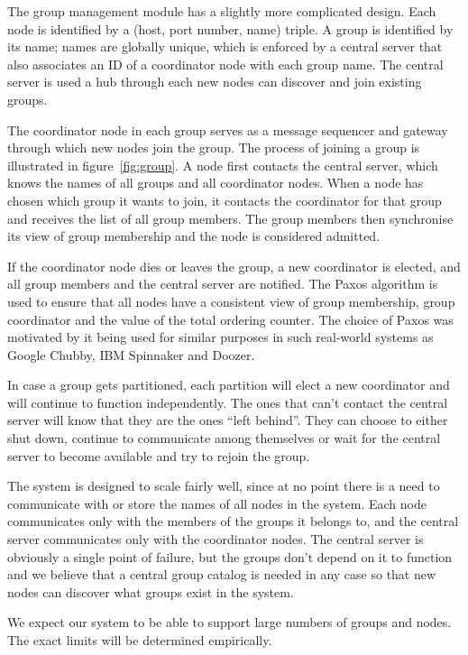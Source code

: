 \documentclass[10pt, oneside]{article}
\begin{document}
The group management module has a slightly more complicated design. Each node is
identified by a (host, port number, name) triple. A group is identified by its
name; names are globally unique, which is enforced by a central server that also
associates an ID of a coordinator node with each group name. The central server
is used a hub through each new nodes can discover and join existing groups.

The coordinator node in each group serves as a message sequencer and gateway
through which new nodes join the group. The process of joining a group is
illustrated in figure~\ref{fig:group}. A node first contacts the central server,
which knows the names of all groups and all coordinator nodes. When a node has
chosen which group it wants to join, it contacts the coordinator for that group
and receives the list of all group members. The group members then synchronise
its view of group membership and the node is considered admitted.

If the coordinator node dies or leaves the group, a new coordinator is elected,
and all group members and the central server are notified. The Paxos
algorithm\cite{Paxos} is used to ensure that all nodes have a consistent view of
group membership, group coordinator and the value of the total ordering
counter. The choice of Paxos was motivated by it being used for similar purposes
in such real-world systems as Google Chubby\cite{Chubby}, IBM
Spinnaker\cite{Spinnaker} and Doozer\cite{Doozer}.

In case a group gets partitioned, each partition will elect a new coordinator
and will continue to function independently. The ones that can't contact the
central server will know that they are the ones ``left behind''. They can choose
to either shut down, continue to communicate among themselves or wait for the
central server to become available and try to rejoin the group.

The system is designed to scale fairly well, since at no point there is a need
to communicate with or store the names of all nodes in the system. Each node
communicates only with the members of the groups it belongs to, and the central
server communicates only with the coordinator nodes. The central server is
obviously a single point of failure, but the groups don't depend on it to
function and we believe that a central group catalog is needed in any case so
that new nodes can discover what groups exist in the system.

We expect our system to be able to support large numbers of groups and
nodes. The exact limits will be determined empirically.
\end{document}
